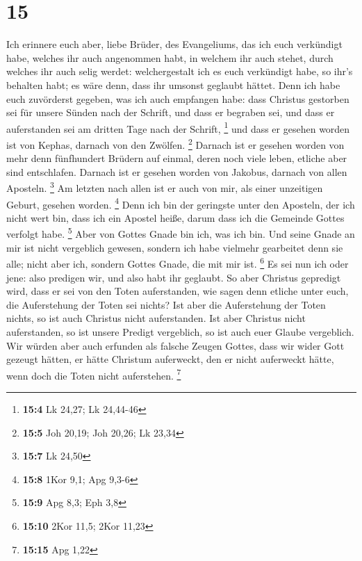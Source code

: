 \hypertarget{section-14}{%
\section{15}\label{section-14}}

 Ich erinnere euch aber, liebe Brüder, des Evangeliums,
das ich euch verkündigt habe, welches ihr auch angenommen habt, in
welchem ihr auch stehet,  durch welches ihr auch selig
werdet: welchergestalt ich es euch verkündigt habe, so ihr's behalten
habt; es wäre denn, dass ihr umsonst geglaubt hättet. 
Denn ich habe euch zuvörderst gegeben, was ich auch empfangen habe: dass
Christus gestorben sei für unsere Sünden nach der Schrift,
 und dass er begraben sei, und dass er auferstanden sei am
dritten Tage nach der Schrift, \footnote{\textbf{15:4} Lk 24,27; Lk
  24,44-46}  und dass er gesehen worden ist von Kephas,
darnach von den Zwölfen. \footnote{\textbf{15:5} Joh 20,19; Joh 20,26;
  Lk 23,34}  Darnach ist er gesehen worden von mehr denn
fünfhundert Brüdern auf einmal, deren noch viele leben, etliche aber
sind entschlafen.  Darnach ist er gesehen worden von
Jakobus, darnach von allen Aposteln. \footnote{\textbf{15:7} Lk 24,50}
 Am letzten nach allen ist er auch von mir, als einer
unzeitigen Geburt, gesehen worden. \footnote{\textbf{15:8} 1Kor 9,1; Apg
  9,3-6}  Denn ich bin der geringste unter den Aposteln,
der ich nicht wert bin, dass ich ein Apostel heiße, darum dass ich die
Gemeinde Gottes verfolgt habe. \footnote{\textbf{15:9} Apg 8,3; Eph 3,8}
 Aber von Gottes Gnade bin ich, was ich bin. Und seine
Gnade an mir ist nicht vergeblich gewesen, sondern ich habe vielmehr
gearbeitet denn sie alle; nicht aber ich, sondern Gottes Gnade, die mit
mir ist. \footnote{\textbf{15:10} 2Kor 11,5; 2Kor 11,23} 
Es sei nun ich oder jene: also predigen wir, und also habt ihr geglaubt.
 So aber Christus gepredigt wird, dass er sei von den
Toten auferstanden, wie sagen denn etliche unter euch, die Auferstehung
der Toten sei nichts?  Ist aber die Auferstehung der
Toten nichts, so ist auch Christus nicht auferstanden. 
Ist aber Christus nicht auferstanden, so ist unsere Predigt vergeblich,
so ist auch euer Glaube vergeblich.  Wir würden aber auch
erfunden als falsche Zeugen Gottes, dass wir wider Gott gezeugt hätten,
er hätte Christum auferweckt, den er nicht auferweckt hätte, wenn doch
die Toten nicht auferstehen. \footnote{\textbf{15:15} Apg 1,22}
